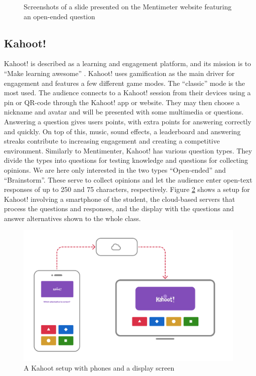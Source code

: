 \begin{figure}[h!]
\caption{Screenshots of a slide presented on the Mentimeter website featuring an open-ended question}
\label{fig:mentimeterscreenshots}
\end{figure}

\subsection{Kahoot!}
Kahoot! is described as a learning and engagement platform, and its mission is to ``Make learning awesome'' \cite{kahootAboutKahoot}. Kahoot! uses gamification as the main driver for engagement and features a few different game modes. The ``classic'' mode is the most used. The audience connects to a Kahoot! session from their devices using a pin or QR-code through the Kahoot! app or website. They may then choose a nickname and avatar and will be presented with some multimedia or questions. Answering a question gives users points, with extra points for answering correctly and quickly. On top of this, music, sound effects, a leaderboard and answering streaks contribute to increasing engagement and creating a competitive environment. Similarly to Mentimenter, Kahoot! has various question types. They divide the types into questions for testing knowledge and questions for collecting opinions. We are here only interested in the two types ``Open-ended'' and ``Brainstorm''. These serve to collect opinions and let the audience enter open-text responses of up to 250 and 75 characters, respectively. Figure \ref{fig:kahootsetup} shows a setup for Kahoot! involving a smartphone of the student, the cloud-based servers that process the questions and responses, and the display with the questions and answer alternatives shown to the whole class.

\begin{figure}[h!]
    \centering
    \includegraphics[width=.8\linewidth]{figures/kahoot-illustration.png}
    \caption{A Kahoot setup with phones and a display screen}
    \label{fig:kahootsetup}
\end{figure}


